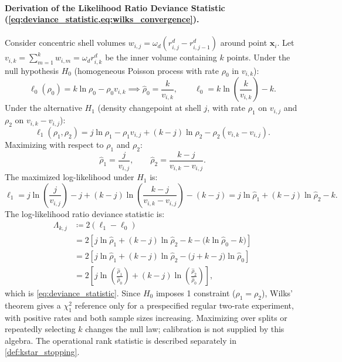 \paragraph{Derivation of the Likelihood Ratio Deviance Statistic
(\cref{eq:deviance_statistic,eq:wilks_convergence}).}
Consider concentric shell volumes $w_{i,j} = \omega_d(r_{i,j}^d -
r_{i,j-1}^d)$ around point $\mathbf{x}_i$.
Let $v_{i,k} = \sum_{m=1}^k w_{i,m} = \omega_d r_{i,k}^d$ be the
inner volume containing $k$ points.
Under the null hypothesis $H_0$ (homogeneous Poisson process with
rate $\rho_0$ in $v_{i,k}$):
\begin{equation}
  \ell_0(\rho_0) = k \ln\rho_0 - \rho_0 v_{i,k} \implies
  \hat{\rho}_0 = \frac{k}{v_{i,k}}, \qquad \ell_0 = k
  \ln\left(\frac{k}{v_{i,k}}\right) - k.
\end{equation}
Under the alternative $H_1$ (density changepoint at shell $j$, with
rate $\rho_1$ on $v_{i,j}$ and $\rho_2$ on $v_{i,k} - v_{i,j}$):
\begin{equation}
  \ell_1(\rho_1, \rho_2) = j \ln\rho_1 - \rho_1 v_{i,j} + (k -
  j)\ln\rho_2 - \rho_2 (v_{i,k} - v_{i,j}).
\end{equation}
Maximizing with respect to $\rho_1$ and $\rho_2$:
\begin{equation}
  \hat{\rho}_1 = \frac{j}{v_{i,j}}, \qquad \hat{\rho}_2 = \frac{k -
  j}{v_{i,k} - v_{i,j}}.
\end{equation}
The maximized log-likelihood under $H_1$ is:
\begin{equation}
  \ell_1 = j \ln\left(\frac{j}{v_{i,j}}\right) - j + (k -
  j)\ln\left(\frac{k - j}{v_{i,k} - v_{i,j}}\right) - (k - j) = j
  \ln\hat{\rho}_1 + (k - j)\ln\hat{\rho}_2 - k.
\end{equation}
The log-likelihood ratio deviance statistic is:
\begin{equation}
  \begin{aligned}
    \Lambda_{k,j} &\coloneqq 2(\ell_1 - \ell_0) \\
    &= 2\left[ j \ln\hat{\rho}_1 + (k - j)\ln\hat{\rho}_2 - k -
    \bigl(k \ln\hat{\rho}_0 - k\bigr) \right] \\
    &= 2\left[ j \ln\hat{\rho}_1 + (k - j)\ln\hat{\rho}_2 - \bigl(j
    + k - j\bigr)\ln\hat{\rho}_0 \right] \\
    &= 2\left[ j \ln\left(\frac{\hat{\rho}_1}{\hat{\rho}_0}\right) +
    (k - j)\ln\left(\frac{\hat{\rho}_2}{\hat{\rho}_0}\right) \right],
  \end{aligned}
\end{equation}
which is \cref{eq:deviance_statistic}. Since $H_0$ imposes 1
constraint ($\rho_1 = \rho_2$),
Wilks' theorem \parencite{wilks1938} gives a $\chi^2_1$ reference only
for a prespecified regular two-rate experiment, with positive rates and
both sample sizes increasing. Maximizing over splits or repeatedly
selecting $k$ changes the null law; calibration is not supplied by this
algebra. The operational rank statistic is described separately in
\cref{def:kstar_stopping}.


